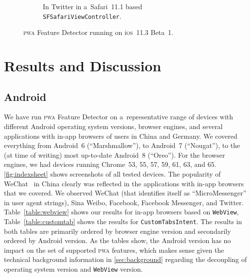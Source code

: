 \documentclass[sigconf]{acmart}
\begin{document}
\begin{figure}[t]
\begin{subfigure}[t]{0.475\columnwidth}
    \caption[\textsc{pwa} Feature Detector running in Twitter.]{
      In Twitter in a~Safari~11.1 based \texttt{SFSafariViewController}.}
    \label{fig:twitter-ios-safari11_1}
  \end{subfigure} 
  \caption{\textsc{pwa} Feature Detector running on i\textsc{os}~11.3 Beta~1.}       
\end{figure}

\section{Results and Discussion}
\label{sec:results-and-discussion}

\subsection{Android}

We have run \textsc{pwa} Feature Detector on a~representative range of devices
with different Android operating system versions, browser engines,
and several applications with in-app browsers of users in China and Germany.
We covered everything from Android~6 (``Marshmallow''),
to Android~7 (``Nougat''),
to the (at time of writing) most up-to-date Android~8 (``Oreo''). 
For the browser engines, we had devices running Chrome~53, 55, 57, 59, 61, 63, and 65.
\autoref{fig:indexsheet} shows screenshots of all tested devices.
The popularity of WeChat~\cite{chan2015wechat} in China clearly was reflected 
in the applications with in-app browsers that we covered.
We observed WeChat (that identifies itself as ``MicroMessenger'' in user agent strings),
Sina Weibo, Facebook, Facebook Messenger, and Twitter.
Table~\ref{table:webview} shows our results for in-app browsers based on
\texttt{WebView}, Table~\ref{table:customtab} shows the results for
\texttt{CustomTabsIntent}.
The results in both tables are primarily ordered by browser engine version
and secondarily ordered by Android version.
As the tables show, the Android version has no impact
on the set of supported \textsc{pwa} features,
which makes sense given the technical background information
in \autoref{sec:background} regarding the decoupling of operating system version
and \texttt{WebView} version.
\end{document}
